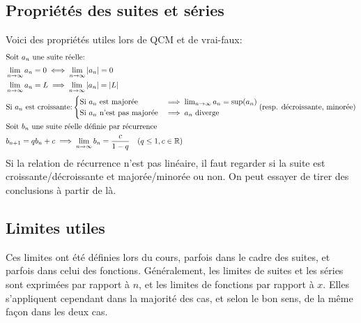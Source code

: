 \documentclass{article}
\begin{document}
\subsection{Propriétés des suites et séries}
Voici des propriétés utiles lors de QCM et de vrai-faux:
\begin{align*}
\intertext{Soit \(a_n\) une suite réelle:} 
	&\lim_{n\to\infty} a_n = 0 \iff \lim_{n\to\infty} |a_n| = 0 \\
	&\lim_{n\to\infty} a_n = L \implies \lim_{n\to\infty} |a_n| = |L| \\
	&\text{Si \(a_n\) est croissante:} \begin{cases}
		\text{Si \(a_n\) est majorée} &\implies \lim_{n\to\infty} a_n = \sup(a_n) \\
		\text{Si \(a_n\) n'est pas majorée} &\implies \text{\(a_n\) diverge}
	\end{cases} \text{(resp. décroissante, minorée)}\\
\intertext{Soit \(b_n\) une suite réelle définie par récurrence}
	&b_{n+1} = qb_n + c \implies \lim_{n\to\infty} b_n = \frac{c}{1-q} \quad (q \leq 1, c \in \mathbb{R}) \\
\end{align*}
Si la relation de récurrence n'est pas linéaire, il faut regarder si la suite est croissante/décroissante et majorée/minorée ou non. On peut essayer de tirer des conclusions à partir de là.

\subsection{Limites utiles}
Ces limites ont été définies lors du cours, parfois dans le cadre des suites, et parfois dans celui des fonctions. Généralement, les limites de suites et les séries sont exprimées par rapport à \(n\), et les limites de fonctions par rapport à \(x\). Elles s'appliquent cependant dans la majorité des cas, et selon le bon sens, de la même façon dans les deux cas.
\end{document}
